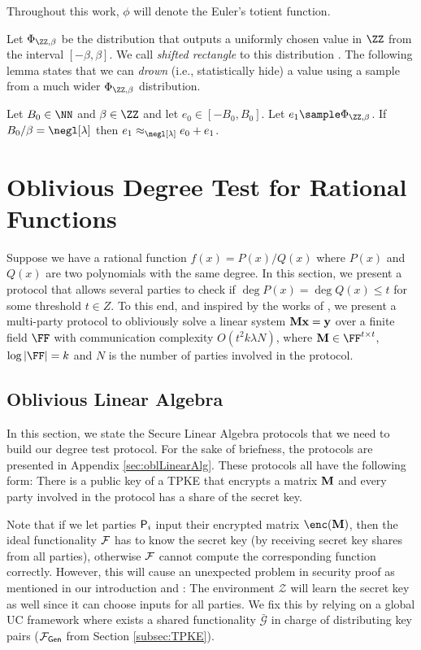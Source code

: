 Throughout this work, $\phi$ will denote the Euler's totient function. 


Let $\Phi_{\ZZ,\beta}$ be the distribution that outputs a uniformly chosen value in $\ZZ$ from the interval $[-\beta,\beta]$. We call \emph{shifted rectangle} to this distribution \cite{FOCS:AppIshKus11}. The following lemma states that we can \emph{drown} (i.e., statistically hide) a value using  a sample from a  much wider $\Phi_{\ZZ,\beta}$ distribution.
\begin{lemma}
\label{lemma:drown}
Let $B_0\in\NN$ and $\beta\in\ZZ$ and let $e_0\in[-B_0,B_0]$. Let $e_1\sample \Phi_{\ZZ,\beta}$. If $B_0/\beta=\negl[\lambda]$ then $e_1\approx_{\negl[\lambda]}e_0+e_1$.
\end{lemma}


\section{Oblivious Degree Test for Rational Functions}\label{sec:degree}

Suppose we have a rational function $f(x)=P(x)/Q(x)$ where $P(x)$ and $Q(x)$ are two polynomials with the same degree. In this section, we present a protocol that allows several parties to check if  $\deg P(x)=\deg Q(x) \leq t$ for some threshold $t\in Z$. To this end, and inspired by the works of \cite{TCC:NisWei06,TCC:KMWF07}, we present a multi-party protocol to obliviously solve a linear system $\mathbf{M}\mathbf{x}=\mathbf{y}$ over a finite field $\FF$ with communication complexity $O(t^2k\lambda N)$, where $\Mn\in\FF^{t\times t}$, $\log |\FF|=k$ and $N$ is the number of parties involved in the protocol.

\subsection{Oblivious Linear Algebra}

In this section, we state the Secure Linear Algebra protocols that we need to build our degree test protocol. For the sake of briefness, the protocols are presented in Appendix \ref{sec:oblLinearAlg}. These protocols all have the following form: There is a public key of a TPKE that encrypts a matrix $\mathbf{M}$ and every party involved in the protocol has a share of the secret key.

Note that if we let parties $\mathsf{P}_i$ input their encrypted matrix $\enc(\Mn)$, then the ideal functionality $\mathcal{F}$ has to know the secret key (by receiving secret key shares from all parties), otherwise $\mathcal{F}$ cannot compute the corresponding function correctly. However, this will cause an unexpected problem in security proof as mentioned in our introduction and \cite{PKC:BMRR21}: The environment $\mathcal{Z}$ will learn the secret key as well since it can choose inputs for all parties. We fix this by relying on a global UC framework where exists a shared functionality $\bar{\mathcal{G}}$ in charge of distributing key pairs ($\mathcal{F}_\mathsf{Gen}$ from Section \ref{subsec:TPKE}).




